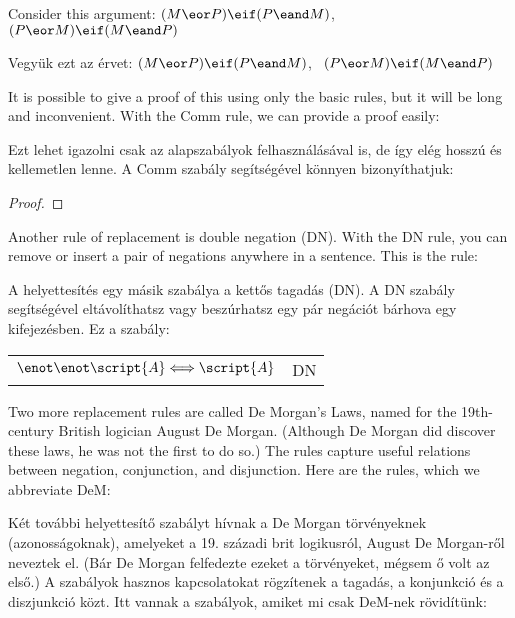 Consider this argument: $(M \eor P) \eif (P \eand M)$, \therefore\ $(P \eor M) \eif (M \eand P)$

Vegyük ezt az érvet: $(M \eor P) \eif (P \eand M)$, \therefore\ $(P \eor M) \eif (M \eand P)$

It is possible to give a proof of this using only the basic rules, but it will be long and inconvenient. With the Comm rule, we can provide a proof easily:

Ezt lehet igazolni csak az alapszabályok felhasználásával is, de így elég hosszú és kellemetlen lenne. A Comm szabály segítségével könnyen bizonyíthatjuk: 

\begin{proof}
\end{proof}

Another rule of replacement is double negation (DN). With the DN rule, you can remove or insert a pair of negations anywhere in a sentence. This is the rule:

A helyettesítés egy másik szabálya a kettős tagadás (DN). A DN szabály segítségével eltávolíthatsz vagy beszúrhatsz egy pár negációt bárhova egy kifejezésben. Ez a szabály: 

\begin{center}
\begin{tabular}{rl}
$\enot\enot\script{A} \Longleftrightarrow \script{A}$ & DN
\end{tabular}
\end{center}

Two more replacement rules are called De Morgan's Laws, named for the 19th-century British logician August De Morgan. (Although De Morgan did discover these laws, he was not the first to do so.) The rules capture useful relations between negation, conjunction, and disjunction. Here are the rules, which we abbreviate DeM:

Két további helyettesítő szabályt hívnak a De Morgan törvényeknek (azonosságoknak), amelyeket a 19. századi brit logikusról, August De Morgan-ről neveztek el. (Bár De Morgan felfedezte ezeket a törvényeket, mégsem ő volt az első.) A szabályok hasznos kapcsolatokat rögzítenek a tagadás, a konjunkció és a diszjunkció közt. Itt vannak a szabályok, amiket mi csak DeM-nek rövidítünk:



